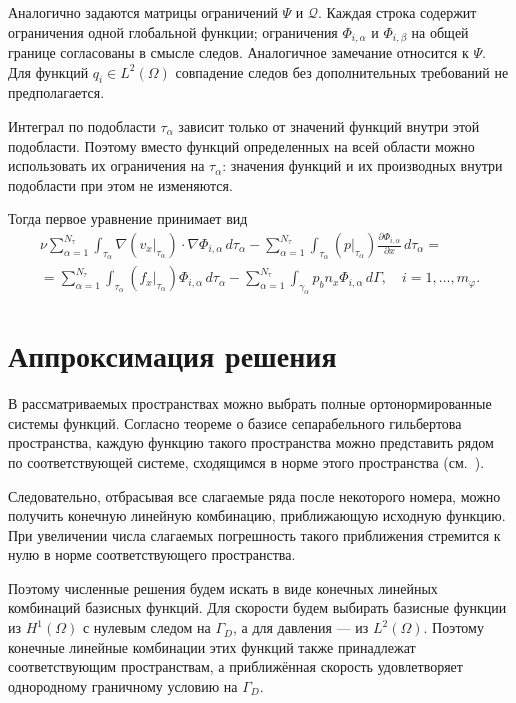 \documentclass[a4paper,14pt]{extarticle}
\begin{document}
Аналогично задаются матрицы ограничений $\Psi$ и $\mathcal Q$.
Каждая строка содержит ограничения одной глобальной функции;
ограничения $\Phi_{i,\alpha}$ и $\Phi_{i,\beta}$ на общей
границе согласованы в смысле следов. Аналогичное замечание
относится к $\Psi$. Для функций $q_i\in L^2(\Omega)$
совпадение следов без дополнительных требований не предполагается.

Интеграл по подобласти $\tau_\alpha$ зависит только от
значений функций внутри этой подобласти. Поэтому вместо
функций определенных на всей области можно использовать их ограничения на $\tau_\alpha$: значения функций и их производных внутри подобласти при этом не изменяются.

Тогда первое уравнение принимает вид
\begin{equation}
	\begin{gathered}
		\nu\sum_{\alpha=1}^{N_\tau}\int_{\tau_\alpha}
		\nabla\left(v_x|_{\tau_\alpha}\right)
		\cdot\nabla\Phi_{i,\alpha}\,d\tau_\alpha
		-
		\sum_{\alpha=1}^{N_\tau}\int_{\tau_\alpha}
		\left(p|_{\tau_\alpha}\right)
		\frac{\partial\Phi_{i,\alpha}}{\partial x}
		\,d\tau_\alpha
		=\\
		=
		\sum_{\alpha=1}^{N_\tau}\int_{\tau_\alpha}
		\left(f_x|_{\tau_\alpha}\right)
		\Phi_{i,\alpha}\,d\tau_\alpha
		-
		\sum_{\alpha=1}^{N_\tau}\int_{\gamma_\alpha}
		p_b n_x\Phi_{i,\alpha}\,d\Gamma,
		\quad i=1,\ldots,m_\varphi.
	\end{gathered}
	\label{eq:restriction_x}
\end{equation}



\section{Аппроксимация решения}

В рассматриваемых пространствах можно выбрать полные
ортонормированные системы функций. Согласно теореме о базисе
сепарабельного гильбертова пространства, каждую функцию
такого пространства можно представить рядом по соответствующей
системе, сходящимся в норме этого пространства
(см.~\cite{hilbert_basis}).

Следовательно, отбрасывая все слагаемые ряда после некоторого
номера, можно получить конечную линейную комбинацию,
приближающую исходную функцию. При увеличении числа слагаемых
погрешность такого приближения стремится к нулю в норме
соответствующего пространства.

Поэтому численные решения будем искать в виде конечных линейных комбинаций базисных функций.
Для скорости будем выбирать базисные функции из
$H^1(\Omega)$ с нулевым следом на $\Gamma_D$, а для давления
--- из $L^2(\Omega)$. Поэтому конечные линейные комбинации
этих функций также принадлежат соответствующим пространствам,
а приближённая скорость удовлетворяет однородному граничному
условию на $\Gamma_D$.
\end{document}
